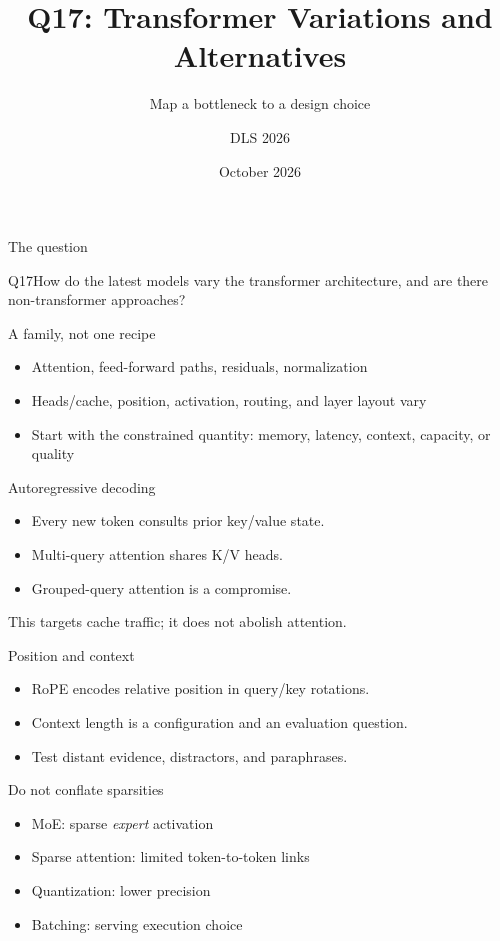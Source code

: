 \documentclass[aspectratio=169,10pt]{beamer}\usetheme{metropolis}
\title{Q17: Transformer Variations and Alternatives}\subtitle{Map a bottleneck to a design choice}\author{DLS 2026}\date{October 2026}
\begin{document}
\maketitle
\begin{frame}{The question}\begin{block}{Q17}How do the latest models vary the transformer architecture, and are there non-transformer approaches?\end{block}\end{frame}
\begin{frame}{A family, not one recipe}\begin{itemize}\item Attention, feed-forward paths, residuals, normalization\item Heads/cache, position, activation, routing, and layer layout vary\item Start with the constrained quantity: memory, latency, context, capacity, or quality\end{itemize}\end{frame}
\begin{frame}{Autoregressive decoding}\begin{itemize}\item Every new token consults prior key/value state.\item Multi-query attention shares K/V heads.\item Grouped-query attention is a compromise.\end{itemize}\alert{This targets cache traffic; it does not abolish attention.}\end{frame}
\begin{frame}{Position and context}\begin{itemize}\item RoPE encodes relative position in query/key rotations.\item Context length is a configuration and an evaluation question.\item Test distant evidence, distractors, and paraphrases.\end{itemize}\end{frame}
\begin{frame}{Do not conflate sparsities}\begin{itemize}\item MoE: sparse \emph{expert} activation\item Sparse attention: limited token-to-token links\item Quantization: lower precision\item Batching: serving execution choice\end{itemize}\end{frame}
\end{document}
